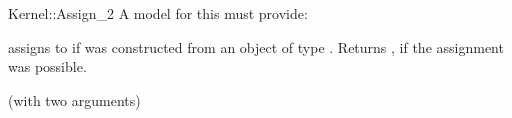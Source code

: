 \begin{ccRefFunctionObjectConcept}{Kernel::Assign_2}
A model for this must provide:


{assigns  to  if 
was constructed from an object of type .
Returns , if the assignment was possible.}

\ccRefines
{} (with two arguments)

\ccSeeAlso
{}\\
  \\
 \\
  \\

\end{ccRefFunctionObjectConcept}
